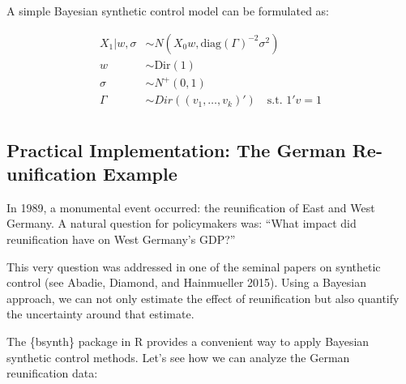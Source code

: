 \documentclass[
  letterpaper,
  DIV=11,
  numbers=noendperiod]{scrreprt}
\newenvironment{Shaded}{\begin{snugshade}}{\end{snugshade}}
\newcommand{\AttributeTok}[1]{\textcolor[rgb]{0.40,0.45,0.13}{#1}}
\newcommand{\ConstantTok}[1]{\textcolor[rgb]{0.56,0.35,0.01}{#1}}
\newcommand{\FloatTok}[1]{\textcolor[rgb]{0.68,0.00,0.00}{#1}}
\newcommand{\FunctionTok}[1]{\textcolor[rgb]{0.28,0.35,0.67}{#1}}
\newcommand{\NormalTok}[1]{\textcolor[rgb]{0.00,0.23,0.31}{#1}}
\newcommand{\OtherTok}[1]{\textcolor[rgb]{0.00,0.23,0.31}{#1}}
\newcommand{\SpecialCharTok}[1]{\textcolor[rgb]{0.37,0.37,0.37}{#1}}
\newcommand{\StringTok}[1]{\textcolor[rgb]{0.13,0.47,0.30}{#1}}
\begin{document}
A simple Bayesian synthetic control model can be formulated as:

\[ 
\begin{aligned}
X_1 | w, \sigma &\sim N(X_0w , \text{diag}(\Gamma)^{-2}\sigma^2) \\
w &\sim \text{Dir}(1)\\
\sigma &\sim N^+(0,1)\\
\Gamma &\sim Dir((v_1, \dots, v_k)') \quad \text{s.t. } 1'v = 1 \\
\end{aligned}
\]

\subsection{Practical Implementation: The German Re-unification
Example}\label{practical-implementation-the-german-re-unification-example}

In 1989, a monumental event occurred: the reunification of East and West
Germany. A natural question for policymakers was: ``What impact did
reunification have on West Germany's GDP?''

This very question was addressed in one of the seminal papers on
synthetic control (see Abadie, Diamond, and Hainmueller 2015). Using a
Bayesian approach, we can not only estimate the effect of reunification
but also quantify the uncertainty around that estimate.

The \{bsynth\} package in R provides a convenient way to apply Bayesian
synthetic control methods. Let's see how we can analyze the German
reunification data:

\begin{Shaded}
\end{Shaded}
\end{document}
